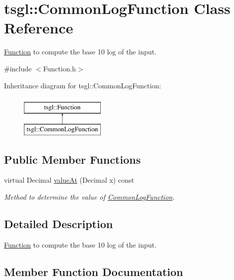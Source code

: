 \hypertarget{classtsgl_1_1_common_log_function}{}\section{tsgl\+:\+:Common\+Log\+Function Class Reference}
\label{classtsgl_1_1_common_log_function}


\hyperlink{classtsgl_1_1_function}{Function} to compute the base 10 log of the input.  




{\ttfamily \#include $<$Function.\+h$>$}

Inheritance diagram for tsgl\+:\+:Common\+Log\+Function\+:\begin{figure}[H]
\begin{center}
\leavevmode
\includegraphics[height=2.000000cm]{classtsgl_1_1_common_log_function}
\end{center}
\end{figure}
\subsection*{Public Member Functions}
\begin{DoxyCompactItemize}
\item 
virtual Decimal \hyperlink{classtsgl_1_1_common_log_function_ac320c0f57c0fc4801bf8eb85f07838d8}{value\+At} (Decimal x) const 
\begin{DoxyCompactList}\small\item\em Method to determine the value of \hyperlink{classtsgl_1_1_common_log_function}{Common\+Log\+Function}. \end{DoxyCompactList}\end{DoxyCompactItemize}


\subsection{Detailed Description}
\hyperlink{classtsgl_1_1_function}{Function} to compute the base 10 log of the input. 

\subsection{Member Function Documentation}
\hypertarget{classtsgl_1_1_common_log_function_ac320c0f57c0fc4801bf8eb85f07838d8}{}
